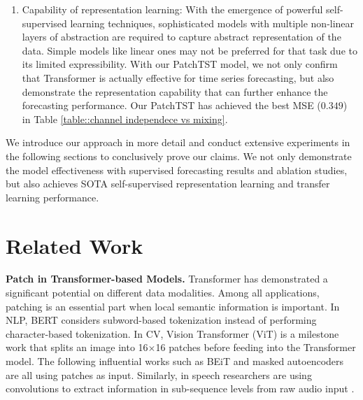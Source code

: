 \documentclass{article} %
\begin{document}
\begin{enumerate}[leftmargin= 25 pt,itemsep= 5 pt,topsep = 0 pt]
    
    \item Capability of representation learning: With the emergence of powerful self-supervised learning techniques, sophisticated models with multiple non-linear layers of abstraction are required to capture abstract representation of the data. Simple models like linear ones \citep{dlinear} may not be preferred for that task due to its limited expressibility. With our PatchTST model, we not only confirm that Transformer is actually effective for time series forecasting, but also demonstrate the representation capability that can further enhance the forecasting performance. Our PatchTST has achieved the best MSE ($0.349$) in Table \ref{table::channel independece vs mixing}.
\end{enumerate}

We introduce our approach in more detail and conduct extensive experiments in the following sections to conclusively prove our claims. We not only demonstrate the model effectiveness with supervised forecasting results and ablation studies, but also achieves SOTA self-supervised representation learning and transfer learning performance.


\section{Related Work}
\label{gen_inst}

\textbf{Patch in Transformer-based Models.}  Transformer \citep{transformer} has demonstrated a significant potential on different data modalities. Among all applications, patching is an essential part when local semantic information is important. In NLP, BERT \citep{bert} considers subword-based tokenization \citep{wordpiece} instead of performing character-based tokenization. In CV, Vision Transformer (ViT) \citep{vit} is a milestone work that splits an image into 16$\times$16 patches before feeding into the Transformer model. The following influential works such as BEiT \citep{beit} and masked autoencoders \citep{mae} are all using patches as input. Similarly, in speech researchers are using convolutions to extract information in sub-sequence levels from raw audio input \citep{wav2vec2,hubert}. 
\end{document}
